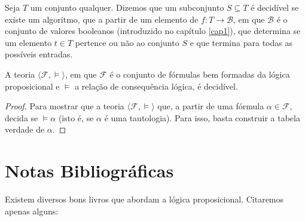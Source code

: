 \begin{Definition}[Decidibilidade]
Seja $T$ um conjunto qualquer. Dizemos que um subconjunto $S \subseteq
T$ é decidível se existe um algoritmo, que a partir de um elemento de $f : T \to \mathcal{B}$, em que
$\mathcal{B}$ é o conjunto de valores booleanos (introduzido no
capítulo \ref{cap1}), que determina se um elemento $t\in T$ pertence
ou não ao conjunto $S$ e que termina para todas as possíveis entradas.
\end{Definition}

\begin{Theorem}
A teoria $\langle \mathcal{F},\models\rangle$, em que $\mathcal{F}$ é
o conjunto de fórmulas bem formadas da lógica proposicional e
$\models$ a relação de consequência lógica, é decidível.
\end{Theorem}
\begin{proof}
Para mostrar que a teoria $\langle \mathcal{F},\models\rangle$ que, a
partir de uma fórmula $\alpha\in\mathcal{F}$, decida se
$\models\alpha$ (isto é, se $\alpha$ é uma tautologia). Para isso,
basta construir a tabela verdade de $\alpha$.
\end{proof}

\section{Notas Bibliográficas}

Existem diversos bons livros que abordam a lógica
proposicional. Citaremos apenas alguns:
